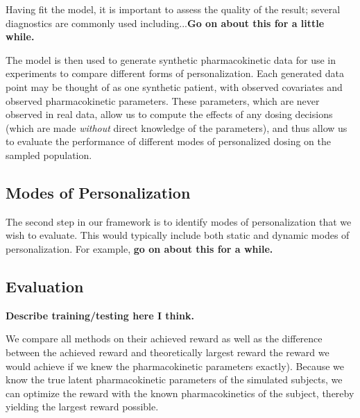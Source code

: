 Having fit the model, it is important to assess the quality of the result; several diagnostics are commonly used including...\textbf{Go on about this for a little while.}

The model is then used to generate synthetic pharmacokinetic data for use in experiments to compare different forms of personalization. Each generated data point may be thought of as one synthetic patient, with observed covariates and observed pharmacokinetic parameters. These parameters, which are never observed in real data, allow us to compute the effects of any dosing decisions (which are made \textit{without} direct knowledge of the parameters), and thus allow us to evaluate the performance of different modes of personalized dosing on the sampled population. 

\subsection{Modes of Personalization}

The second step in our framework is to identify modes of personalization that we wish to evaluate. This would typically include both static and dynamic modes of personalization. For example, \textbf{go on about this for a while.}

\subsection{Evaluation}

\textbf{Describe training/testing here I think.}

We compare all methods on their achieved reward as well as the difference between the achieved reward and theoretically largest reward the reward we would achieve if we knew the pharmacokinetic parameters exactly).  Because we know the true latent pharmacokinetic parameters of the simulated subjects, we can optimize the reward with the known pharmacokinetics of the subject, thereby yielding the largest reward possible.